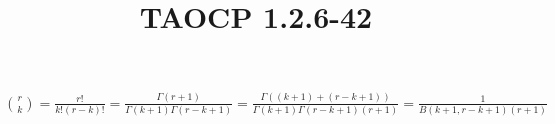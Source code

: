 \documentclass{article}
\title{TAOCP 1.2.6\mbox{-}42}
\begin{document}
\maketitle

\( \binom{r}{k} = \frac{r!}{k!(r-k)!} = \frac{\Gamma(r+1)}{\Gamma(k+1)\Gamma(r-k + 1)} = \frac{\Gamma((k+1) + (r-k+1))}{\Gamma(k+1)\Gamma(r-k + 1)(r+1)} = \frac{1}{B(k+1, r-k+1) (r+1)} \)
\end{document}
